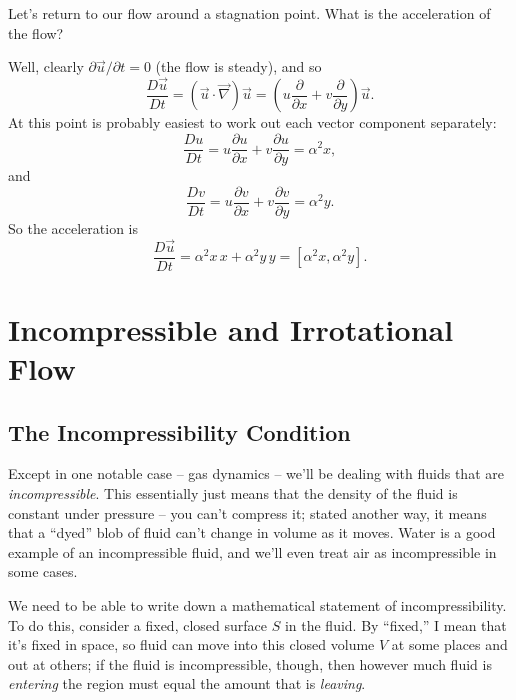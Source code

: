 \begin{example}
Let's return to our flow around a stagnation point.  What is the acceleration of the flow?

Well, clearly $\partial \vec{u} /\partial t = 0$ (the flow is steady), and so
\[
\frac{D \vec{u}}{Dt} = (\vec{u} \cdot \vec{\nabla} ) \vec{u} = \left( u \frac{\partial}{\partial x} + v\frac{\partial}{\partial y} \right) \vec{u}.
\]
At this point is probably easiest to work out each vector component separately:
\[
\frac{D u}{Dt} =  u \frac{\partial u}{\partial x} + v\frac{\partial u}{\partial y}  = \alpha^2 x,
\]
and
\[
\frac{D v}{Dt} =  u \frac{\partial v}{\partial x} + v\frac{\partial v}{\partial y}  = \alpha^2 y.
\]
So the acceleration is
\[
\frac{D \vec{u}}{Dt} = \alpha^2 x \, \unit{x} + \alpha^2 y \, \unit{y} = [\alpha^2 x, \alpha^2 y].
\]

\end{example}

%
%
%

\section{Incompressible and Irrotational Flow}

\subsection{The Incompressibility Condition}
\label{sec_incompressibility}

Except in one notable case -- gas dynamics -- we'll be dealing with fluids that are \emph{incompressible}.  This essentially just means that the density of the fluid is constant under pressure -- you can't compress it; stated another way, it means that a ``dyed'' blob of fluid can't change in volume as it moves.  Water is a good example of an incompressible fluid, and we'll even treat air as incompressible in some cases.

We need to be able to write down a mathematical statement of incompressibility.  To do this, consider a fixed, closed surface $S$ in the fluid.  By ``fixed,'' I mean that it's fixed in space, so fluid can move into this closed volume $V$ at some places and out at others; if the fluid is incompressible, though, then however much fluid is \emph{entering} the region must equal the amount that is \emph{leaving}.  

